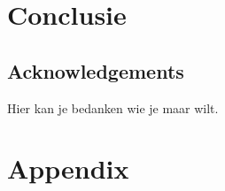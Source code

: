 \section{Conclusie}


\subsection{Acknowledgements}
Hier kan je bedanken wie je maar wilt.

\newpage
\section{Appendix}